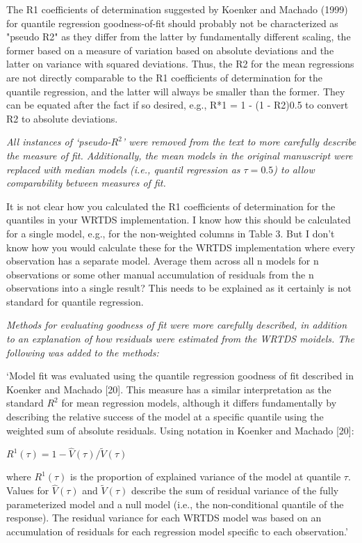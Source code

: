 \documentclass[letterpaper,12pt,oneside]{article}\usepackage[]{graphicx}\usepackage[]{color}
\begin{document}
The R1 coefficients of determination suggested by Koenker and Machado (1999) for quantile regression goodness-of-fit should probably not be characterized as "pseudo R2" as they differ from the latter by fundamentally different scaling, the former based on a measure of variation based on absolute deviations and the latter on variance with squared deviations.  Thus, the R2 for the mean regressions are not directly comparable to the R1 coefficients of determination for the quantile regression, and the latter will always be smaller than the former.   They can be equated after the fact if so desired, e.g., R*1 = 1 - (1 - R2)0.5 to convert R2 to absolute deviations.  

{\it All instances of `pseudo-$R^2$' were removed from the text to more carefully describe the measure of fit.  Additionally, the mean models in the original manuscript were replaced with median models (i.e., quantil regression as $\tau = 0.5$) to allow comparability between measures of fit.}

It is not clear how you calculated the R1 coefficients of determination for the quantiles in your WRTDS implementation.  I know how this should be calculated for a single model, e.g., for the non-weighted columns in Table 3.  But I don't know how you would calculate these for the WRTDS implementation where every observation has a separate model.  Average them across all n models for n observations or some other manual accumulation of residuals from the n observations into a single result?  This needs to be explained as it certainly is not standard for quantile regression.

{\it Methods for evaluating goodness of fit were more carefully described, in addition to an explanation of how residuals were estimated from the WRTDS moidels.  The following was added to the methods:

`Model fit was evaluated using the quantile regression goodness of fit described in Koenker and Machado [20].  This measure has a similar interpretation as the standard $R^2$ for mean regression models, although it differs fundamentally by describing the relative success of the model at a specific quantile using the weighted sum of absolute residuals. Using notation in Koenker and Machado [20]:
\begin{center}
$R^1\left(\tau\right) = 1 - \hat{V}\left(\tau\right)/\tilde{V}\left(\tau\right)$
\end{center}
\noindent where $R^1\left(\tau\right)$ is the proportion of explained variance of the model at quantile $\tau$.  Values for $\hat{V}\left(\tau\right)$ and $\tilde{V}\left(\tau\right)$ describe the sum of residual variance of the fully parameterized model and a null model (i.e., the non-conditional quantile of the response).  The residual variance for each WRTDS model was based on an accumulation of residuals for each regression model specific to each observation.'}
\end{document}

